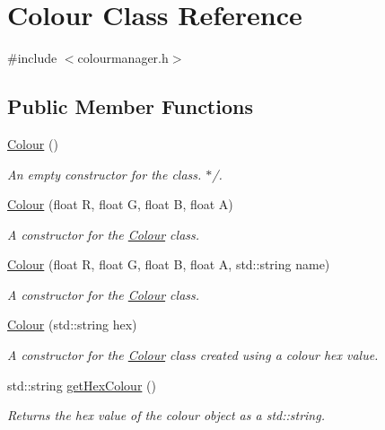 \hypertarget{classColour}{}\section{Colour Class Reference}
\label{classColour}


{\ttfamily \#include $<$colourmanager.\+h$>$}

\subsection*{Public Member Functions}
\begin{DoxyCompactItemize}
\item 
\mbox{\label{classColour_a46612b9524fcd4cee818af6a86b7a4d2}} 
\hyperlink{classColour_a46612b9524fcd4cee818af6a86b7a4d2}{Colour} ()
\begin{DoxyCompactList}\small\item\em An empty constructor for the class. $\ast$/. \end{DoxyCompactList}\item 
\hyperlink{classColour_a25a9ec348579c9df5363220ccbc1f3ec}{Colour} (float R, float G, float B, float A)
\begin{DoxyCompactList}\small\item\em A constructor for the \hyperlink{classColour}{Colour} class. \end{DoxyCompactList}\item 
\hyperlink{classColour_a4a447496ea54cc0d8b5f5cc5131ae0b6}{Colour} (float R, float G, float B, float A, std\+::string name)
\begin{DoxyCompactList}\small\item\em A constructor for the \hyperlink{classColour}{Colour} class. \end{DoxyCompactList}\item 
\hyperlink{classColour_a0a90c893db7eb92dd6fac4557123c3ac}{Colour} (std\+::string hex)
\begin{DoxyCompactList}\small\item\em A constructor for the \hyperlink{classColour}{Colour} class created using a colour hex value. \end{DoxyCompactList}\item 
std\+::string \hyperlink{classColour_a7f0220a8b5a1a0b476a1dc8f305484f7}{get\+Hex\+Colour} ()
\begin{DoxyCompactList}\small\item\em Returns the hex value of the colour object as a std\+::string. \end{DoxyCompactList}\item 

\end{DoxyCompactItemize}
